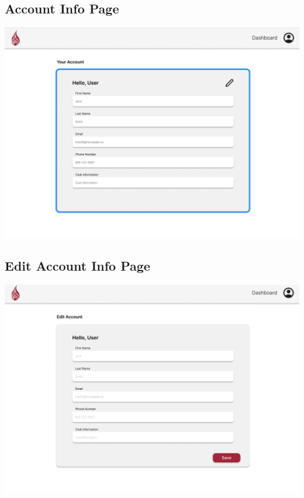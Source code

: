 \documentclass[12pt, titlepage]{article}
\begin{document}
\subsection{Account Info Page}
\includegraphics[]{imgs/AccountInfoPage.png}

\subsection{Edit Account Info Page}
\includegraphics[]{imgs/EditAccountInfoPage.png}
\end{document}
